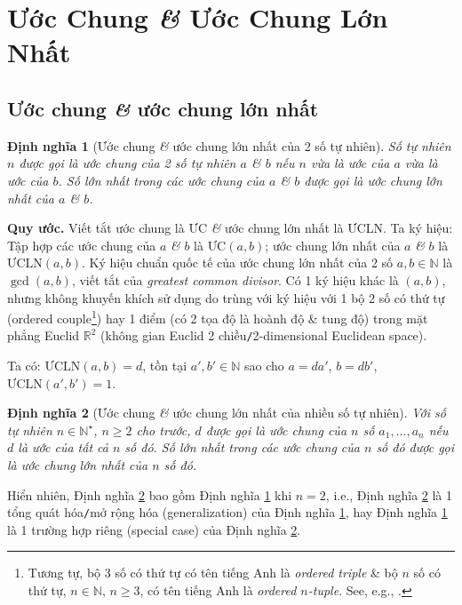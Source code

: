 \documentclass{article}
\numberwithin{equation}{section}
\newtheorem{dinhnghia}{Định nghĩa}[section]
\begin{document}
\section{Ước Chung \textit{\&} Ước Chung Lớn Nhất}

\subsection{Ước chung \textit{\&} ước chung lớn nhất}

\begin{dinhnghia}[Ước chung \textit{\&} ước chung lớn nhất của 2 số tự nhiên]
	\label{def: ước chung 2 số}
	Số tự nhiên $n$ được gọi là \emph{ước chung} của 2 số tự nhiên $a$ \textit{\&} $b$ nếu $n$ vừa là ước của $a$ vừa là ước của $b$. Số lớn nhất trong các ước chung của $a$ \textit{\&} $b$ được gọi là \emph{ước chung lớn nhất} của $a$ \textit{\&} $b$.
\end{dinhnghia}
\noindent\textbf{Quy ước.} Viết tắt ước chung là ƯC \textit{\&} ước chung lớn nhất là ƯCLN. Ta ký hiệu: Tập hợp các ước chung của $a$ \textit{\&} $b$ là $\mbox{ƯC}(a,b)$; ước chung lớn nhất của $a$ \textit{\&} $b$ là $\mbox{ƯCLN}(a,b)$. Ký hiệu chuẩn quốc tế của ước chung lớn nhất của 2 số $a,b\in\mathbb{N}$ là $\gcd(a,b)$, viết tắt của \textit{greatest common divisor}. Có 1 ký hiệu khác là $(a,b)$, nhưng không khuyến khích sử dụng do trùng với ký hiệu với 1 bộ 2 số có thứ tự (ordered couple\footnote{Tương tự, bộ 3 số có thứ tự có tên tiếng Anh là \textit{ordered triple} \& bộ $n$ số có thứ tự, $n\in\mathbb{N}$, $n\ge 3$, có tên tiếng Anh là \textit{ordered $n$-tuple}. See, e.g., \cite{Rudin1976}.}) hay 1 điểm (có 2 tọa độ là hoành độ \& tung độ) trong mặt phẳng Euclid $\mathbb{R}^2$ (không gian Euclid 2 chiều\texttt{/}2-dimensional Euclidean space).

Ta có: $\mbox{ƯCLN}(a,b)= d$, tồn tại $a',b'\in\mathbb{N}$ sao cho $a = da'$, $b = db'$, $\mbox{ƯCLN}(a',b') = 1$.

\begin{dinhnghia}[Ước chung \textit{\&} ước chung lớn nhất của nhiều số tự nhiên]
	\label{def: ước chung nhiều số}
	Với số tự nhiên $n\in\mathbb{N}^\star$, $n\ge 2$ cho trước, $d$ được gọi là \emph{ước chung} của $n$ số $a_1,\ldots,a_n$ nếu $d$ là ước của tất cả $n$ số đó. Số lớn nhất trong các ước chung của $n$ số đó được gọi là \emph{ước chung lớn nhất} của $n$ số đó.
\end{dinhnghia}
Hiển nhiên, Định nghĩa \ref{def: ước chung nhiều số} bao gồm Định nghĩa \ref{def: ước chung 2 số} khi $n = 2$, i.e., Định nghĩa \ref{def: ước chung nhiều số} là 1 tổng quát hóa\texttt{/}mở rộng hóa (generalization) của Định nghĩa \ref{def: ước chung 2 số}, hay Định nghĩa \ref{def: ước chung 2 số} là 1 trường hợp riêng (special case) của Định nghĩa \ref{def: ước chung nhiều số}.
\end{document}
